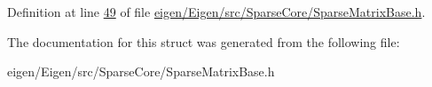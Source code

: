 Definition at line \hyperlink{eigen_2_eigen_2src_2_sparse_core_2_sparse_matrix_base_8h_source_l00049}{49} of file \hyperlink{eigen_2_eigen_2src_2_sparse_core_2_sparse_matrix_base_8h_source}{eigen/\+Eigen/src/\+Sparse\+Core/\+Sparse\+Matrix\+Base.\+h}.



The documentation for this struct was generated from the following file\+:\begin{DoxyCompactItemize}
\item 
eigen/\+Eigen/src/\+Sparse\+Core/\+Sparse\+Matrix\+Base.\+h\end{DoxyCompactItemize}
